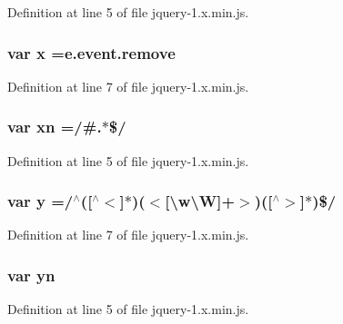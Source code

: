 Definition at line 5 of file jquery-\/1.\+x.\+min.\+js.

\subsubsection[{\texorpdfstring{x}{x}}]{\setlength{\rightskip}{0pt plus 5cm}var x ={\bf e.\+event.\+remove}}\hypertarget{jquery-1_8x_8min_8js_a81e910173af87b1161e719a504d52407}{}\label{jquery-1_8x_8min_8js_a81e910173af87b1161e719a504d52407}


Definition at line 7 of file jquery-\/1.\+x.\+min.\+js.

\subsubsection[{\texorpdfstring{xn}{xn}}]{\setlength{\rightskip}{0pt plus 5cm}var xn =/\#.$\ast$\$/}\hypertarget{jquery-1_8x_8min_8js_a5d600963c6441f15f548bc0b847b6a04}{}\label{jquery-1_8x_8min_8js_a5d600963c6441f15f548bc0b847b6a04}


Definition at line 5 of file jquery-\/1.\+x.\+min.\+js.

\subsubsection[{\texorpdfstring{y}{y}}]{\setlength{\rightskip}{0pt plus 5cm}var y =/$^\wedge$(\mbox{[}$^\wedge$$<$\mbox{]}$\ast$)($<$\mbox{[}\textbackslash{}w\textbackslash{}W\mbox{]}+$>$)(\mbox{[}$^\wedge$$>$\mbox{]}$\ast$)\$/}\hypertarget{jquery-1_8x_8min_8js_a0b31909b1cae9ed1db6ff042057fce60}{}\label{jquery-1_8x_8min_8js_a0b31909b1cae9ed1db6ff042057fce60}


Definition at line 7 of file jquery-\/1.\+x.\+min.\+js.

\subsubsection[{\texorpdfstring{yn}{yn}}]{\setlength{\rightskip}{0pt plus 5cm}var yn}\hypertarget{jquery-1_8x_8min_8js_a390d7ca752a48e31e8ffb5209c0a4cd6}{}\label{jquery-1_8x_8min_8js_a390d7ca752a48e31e8ffb5209c0a4cd6}


Definition at line 5 of file jquery-\/1.\+x.\+min.\+js.

